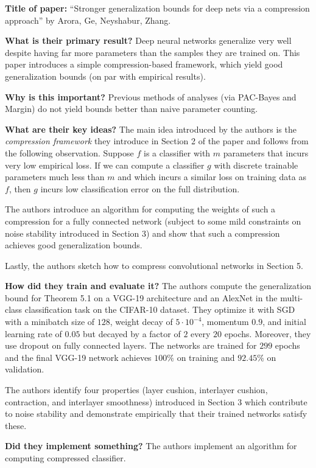\noindent \textbf{Title of paper:} ``Stronger generalization bounds for deep
nets via a compression approach'' by Arora, Ge, Neyshabur, Zhang. 

\noindent\textbf{What is their primary result?} Deep neural networks generalize
very well despite having far more parameters than the samples they are trained
on. This paper introduces a simple compression-based framework, which yield good
generalization bounds (on par with empirical results).

\noindent\textbf{Why is this important?} Previous methods of analyses (via
PAC-Bayes and Margin) do not yield bounds better than naive parameter counting. 

\noindent\textbf{What are their key ideas?} The main idea introduced by the
authors is the \emph{compression framework} they introduce in Section 2 of the
paper and follows from the following observation. Suppose $f$ is a classifier
with $m$ parameters that incurs very low empirical loss. If we can compute a
classifier $g$ with discrete trainable parameters much less than $m$ and which
incurs a similar loss on training data as $f$, then $g$ incurs low
classification error on the full distribution.

The authors introduce an algorithm for computing the weights of such a
compression for a fully connected network (subject to some mild constraints on
noise stability introduced in Section 3) and show that such a compression
achieves good generalization bounds.

Lastly, the authors sketch how to compress convolutional networks in Section 5.




\noindent\textbf{How did they train and evaluate it?} The authors compute the
generalization bound for Theorem 5.1 on a VGG-19 architecture and an AlexNet in
the multi-class classification task on the CIFAR-10 dataset. They optimize it
with SGD with a minibatch size of $128$, weight decay of $5\cdot 10^{-4}$,
momentum $0.9$, and initial learning rate of $0.05$ but decayed by a factor of
$2$ every $20$ epochs. Moreover, they use dropout on fully connected layers. The
networks are trained for $299$ epochs and the final VGG-19 network achieves
$100\%$ on training and $92.45\%$ on validation.

The authors identify four properties (layer cushion, interlayer cushion,
contraction, and interlayer smoothness) introduced in Section 3 which contribute
to noise stability and demonstrate empirically that their trained networks
satisfy these.

\noindent\textbf{Did they implement something?} The authors implement an
algorithm for computing compressed classifier. 


